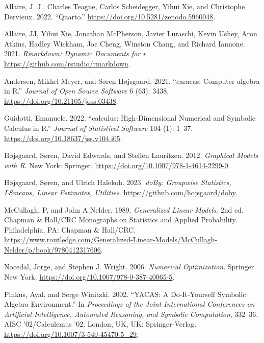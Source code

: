 \hypertarget{refs}{}
\begin{CSLReferences}{1}{0}
\leavevmode{}%
Allaire, J. J., Charles Teague, Carlos Scheidegger, Yihui Xie, and Christophe Dervieux. 2022. {``{Quarto}.''} \url{https://doi.org/10.5281/zenodo.5960048}.

\leavevmode{}%
Allaire, JJ, Yihui Xie, Jonathan McPherson, Javier Luraschi, Kevin Ushey, Aron Atkins, Hadley Wickham, Joe Cheng, Winston Chang, and Richard Iannone. 2021. \emph{Rmarkdown: Dynamic Documents for r}. \url{https://github.com/rstudio/rmarkdown}.

\leavevmode{}%
Andersen, Mikkel Meyer, and Søren Højsgaard. 2021. {``{caracas: Computer algebra in R}.''} \emph{Journal of Open Source Software} 6 (63): 3438. \url{https://doi.org/10.21105/joss.03438}.

\leavevmode{}%
Guidotti, Emanuele. 2022. {``{calculus: High-Dimensional Numerical and Symbolic Calculus in R}.''} \emph{Journal of Statistical Software} 104 (1): 1--37. \url{https://doi.org/10.18637/jss.v104.i05}.

\leavevmode{}%
Højsgaard, Søren, David Edwards, and Steffen Lauritzen. 2012. \emph{Graphical Models with {R}}. New York: Springer. \url{https://doi.org/10.1007/978-1-4614-2299-0}.

\leavevmode{}%
Højsgaard, Søren, and Ulrich Halekoh. 2023. \emph{{doBy: Groupwise Statistics, LSmeans, Linear Estimates, Utilities}}. \url{https://github.com/hojsgaard/doby}.

\leavevmode{}%
McCullagh, P, and John A Nelder. 1989. \emph{{Generalized Linear Models}}. 2nd ed. Chapman \& Hall/{CRC} Monographs on Statistics and Applied Probability. Philadelphia, PA: Chapman \& Hall/{CRC}. \url{https://www.routledge.com/Generalized-Linear-Models/McCullagh-Nelder/p/book/9780412317606}.

\leavevmode{}%
Nocedal, Jorge, and Stephen J. Wright. 2006. \emph{{Numerical Optimization}}. Springer New York. \url{https://doi.org/10.1007/978-0-387-40065-5}.

\leavevmode{}%
Pinkus, Ayal, and Serge Winitzki. 2002. {``{YACAS: A Do-It-Yourself Symbolic Algebra Environment}.''} In \emph{Proceedings of the Joint International Conferences on Artificial Intelligence, Automated Reasoning, and Symbolic Computation}, 332--36. AISC '02/Calculemus '02. London, UK, UK: Springer-Verlag. \url{https://doi.org/10.1007/3-540-45470-5_29}.


\end{CSLReferences}
